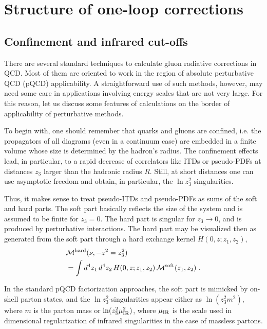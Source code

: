 \section{Structure of one-loop corrections}

\subsection{Confinement and infrared cut-offs}

 There are several standard techniques to calculate gluon radiative corrections in QCD.
 Most of them  are oriented to work in the region of
 absolute perturbative QCD (pQCD) applicability.
A
  straightforward use of such methods, however,
 may need some  care  in applications involving energy scales
 that are not very large.
   For this reason,  let us discuss
   some features of calculations
   on the border of applicability of perturbative methods.


To begin with, one should  remember that quarks and gluons are confined, i.e.
 the  propagators of all   diagrams  (even in a continuum case)
 are embedded in a finite volume whose size is determined by the hadron's radius.
 The confinement  effects lead, in particular,
  to a rapid   decrease of  correlators like ITDs or pseudo-PDFs  at  distances $z_3$
larger  than the  hadronic radius  $R$.
Still,  at short distances  one can  use  asymptotic freedom
and obtain, in particular, the $\ln z_3^2$ singularities.

Thus, it makes sense to treat  pseudo-ITDs and  pseudo-PDFs  as  sums  of the soft and hard parts.
The soft  part  basically
reflects  the  size of the system  and is assumed to be  finite for $z_3=0$.   The hard part
is   singular for \mbox{$z_3 \to 0$},   and  is   produced by perturbative interactions.
The hard part may be visualized  then as
generated from the soft part  through a hard exchange kernel $ H (0,z; z_1, z_2)$,
\begin{align}
    & {\cal M}^{\rm   hard} (\nu, -z^2=z_3^2)
    \nonumber \\  & =   \int d^4z_1 \, d^4 z_2 \, H (0,z; z_1, z_2) \,  {\cal M}^{\rm  soft} (z_1,z_2)\  .
\label{Mhar}
\end{align}

In the standard  pQCD factorization approaches,
the soft part is mimicked  by on-shell parton states, and the
 \mbox{$\ln z_3^2$-singularities}  appear either as $\ln (z_3^2 m^2)$,
where $m$ is the parton mass or  $\ln (z_3^2 \mu_{\rm IR}^2)$,
where $\mu_{\rm IR}$ is the scale used in dimensional regularization
of infrared singularities in  the  case of massless partons.



